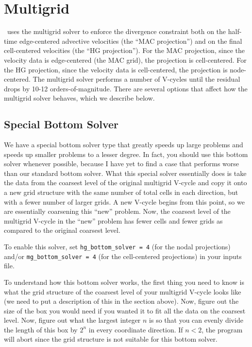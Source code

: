 \section{Multigrid}

\maestro\ uses the multigrid solver to enforce the divergence constraint
both on the half-time edge-centered advective velocities (the ``MAC
projection'') and on the final cell-centered velocities (the ``HG
projection'').  For the MAC projection, since the velocity data is
edge-centered (the MAC grid), the projection is cell-centered.  For
the HG projection, since the velocity data is cell-centered, the
projection is node-centered.   The multigrid solver performs a number
of V-cycles until the residual drops by 10-12 orders-of-magnitude.
There are several options that affect how the multigrid solver
behaves, which we describe below.

\subsection{Special Bottom Solver}
We have a special bottom solver type that greatly speeds up large problems
and speeds up smaller problems to a lesser degree.
In fact, you should use this bottom solver whenever possible, because I
have yet to find a case that performs worse than our standard bottom solver.
What this special solver essentially does is take the data from the coarsest 
level of the original multigrid V-cycle and copy it onto a new grid structure 
with the same number of total cells in each direction, but with a fewer number of larger 
grids.  A new V-cycle begins from this point, 
so we are essentially coarsening this ``new'' problem.
Now, the coarsest level of the multigrid V-cycle in the ``new'' problem has 
fewer cells and fewer grids as compared to the original coarsest level.

To enable this solver, set {\tt hg\_bottom\_solver = 4} (for the nodal
projections) and/or {\tt mg\_bottom\_solver = 4} (for the cell-centered
projections) in your inputs file.

To understand how this bottom solver works, the first thing you need to know
is what the grid structure of the coarsest level of your multigrid V-cycle
looks like (we need to put a description of this in the section above).
Now, figure out the size of the box you would need if you
wanted it to fit all the data on the coarsest level.  Now, figure out what
the largest integer $n$ is so that you can evenly divide the length of this box
by $2^n$ in every coordinate direction.  If $n < 2$, the program will abort
since the grid structure is not suitable for this bottom solver.

